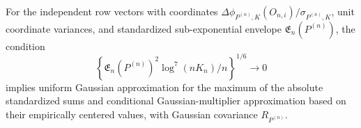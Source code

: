 For the independent row vectors with coordinates \(\Delta\phi_{P^{(n)},K}(O_{n,i})/\sigma_{P^{(n)},K}\), unit coordinate variances, and standardized sub-exponential envelope \(\mathfrak E_n(P^{(n)})\), the condition
\[
 \left\{\mathfrak E_n(P^{(n)})^2\log^7(nK_n)/n\right\}^{1/6}\to0
\]
implies uniform Gaussian approximation for the maximum of the absolute standardized sums and conditional Gaussian-multiplier approximation based on their empirically centered values, with Gaussian covariance \(R_{P^{(n)}}\).